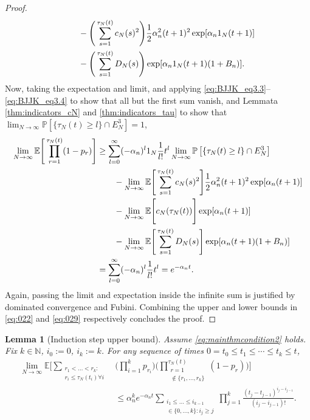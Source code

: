 \documentclass[12pt,authoryear]{article}
\newtheorem{lemma}{Lemma}
\theoremstyle{definition}
\newcommand{\Prob}{\mathbb{P}}
\newcommand{\E}{\mathbb{E}}
\newcommand{\1}[1]{\mathbbm{1}_{#1}}
\newcommand{\ON}{1_N}
\begin{document}
\begin{proof}
\begin{align}
    &\qquad - \Bigg( \sum_{s=1}^{\tau_N(t)} c_N(s)^2 \Bigg)
        \frac{1}{2} \alpha_n^2 (t+1)^2 \exp[ \alpha_n \ON (t+1) ]\notag\\
    &\qquad- \Bigg( \sum_{s=1}^{\tau_N(t)} D_N(s) \Bigg)
        \exp[ \alpha_n \ON (t+1) (1+B_n) ]. \label{eq:028}
\end{align}
Now, taking the expectation and limit, and applying \eqref{eq:BJJK_eq3.3}--\eqref{eq:BJJK_eq3.4} to show that all but the first sum vanish, and Lemmata \ref{thm:indicators_cN} and \ref{thm:indicators_tau} to show that $\lim_{N\to\infty} \Prob[ \{\tau_N(t) \geq l\} \cap E_N^3 ] =1$,
\begin{align}
\lim_{N\to\infty} \E \Bigg[ \prod_{r=1}^{\tau_N(t)} (1-p_r) \Bigg]
&\geq \sum_{l=0}^{\infty} (-\alpha_n)^l \ON \frac{1}{l!} t^l 
        \lim_{N\to\infty} \Prob\left[ \{\tau_N(t) \geq l\} \cap E_N^3 \right] \notag\\
    &\qquad- \lim_{N\to\infty} \E \Bigg[ \sum_{s=1}^{\tau_N(t)} c_N(s)^2 \Bigg]
        \frac{1}{2} \alpha_n^2 (t+1)^2 \exp[ \alpha_n (t+1) ]\notag\\
    &\qquad- \lim_{N\to\infty} \E \Bigg[ c_N(\tau_N(t)) \Bigg] 
        \exp[ \alpha_n (t+1) ] \notag\\
    &\qquad- \lim_{N\to\infty} \E \Bigg[ \sum_{s=1}^{\tau_N(t)} D_N(s) \Bigg]
        \exp[ \alpha_n (t+1) (1+B_n) ] \notag\\
&= \sum_{l=0}^{\infty} (-\alpha_n)^l \frac{1}{l!} t^l
= e^{-\alpha_n t}. \label{eq:029}
\end{align}
Again, passing the limit and expectation inside the infinite sum is justified by dominated convergence and Fubini.
Combining the upper and lower bounds in \eqref{eq:022} and \eqref{eq:029} respectively concludes the proof.
\end{proof}

\begin{lemma}[Induction step upper bound]\label{thm:inductionUB}
Assume \eqref{eq:mainthmcondition2} holds.
Fix $k \in \mathbb{N}$, $i_0:=0$, $i_k:=k$. For any sequence of times
$0 = t_0 \leq t_1 \leq \cdots \leq t_k \leq t$,
\begin{align*}
\lim_{N\to\infty} \E \Bigg[ 
        \sum_{\substack{r_1 <\dots< r_k :\\ r_i \leq \tau_N(t_i) \forall i}}
        &\Bigg( \prod_{i=1}^k p_{r_i} \Bigg)
        \Bigg( \prod_{\substack{r=1 \\ \notin \{r_1,\dots,r_k\} }}^{\tau_N(t)} 
        (1-p_r) \Bigg) \Bigg] \\
&\leq \alpha_n^k e^{-\alpha_n t}
        \sum_{\substack{i_1\leq \dots\leq i_{k-1}\\ \in \{0,\dots,k\} :
         i_j \geq j}} %
        \prod_{j=1}^k \frac{(t_j - t_{j-1})^{i_j - i_{j-1}}}{(i_j - i_{j-1})! } .
\end{align*}
\end{lemma}
\end{document}
